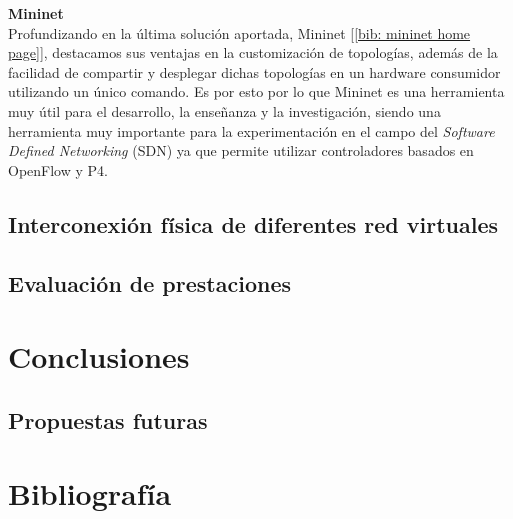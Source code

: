 \documentclass[12pt]{article}
\begin{document}
	\noindent \textbf{\large Mininet}\\
	
	\noindent Profundizando en la última solución aportada, Mininet [\ref{bib: mininet home page}], destacamos sus ventajas en la customización de topologías, además de la facilidad de compartir y desplegar dichas topologías en un hardware consumidor utilizando un único comando. Es por esto por lo que Mininet es una herramienta muy útil para el desarrollo, la enseñanza y la investigación, siendo una herramienta muy importante para la experimentación en el campo del \textit{Software Defined Networking} (SDN) ya que permite utilizar controladores basados en OpenFlow y P4.
	
	\subsection{Interconexión física de diferentes red virtuales}
	\subsection{Evaluación de prestaciones}
	
	\pagebreak
	
	\section{Conclusiones}
	
	\subsection{Propuestas futuras}
	

	\pagebreak
	\section*{Bibliografía}
\end{document}
